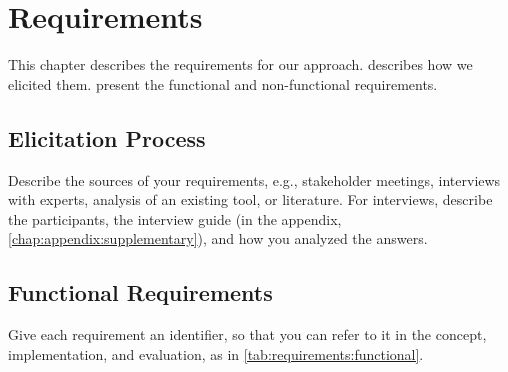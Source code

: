 \chapter{Requirements}\label{chap:requirements}


This chapter describes the requirements for our approach.
 describes how we elicited them.
 present the functional and non-functional requirements.

\section{Elicitation Process}\label{sec:requirements:elicitation}

Describe the sources of your requirements, e.g., stakeholder meetings, interviews with experts, analysis of an existing tool, or literature.
For interviews, describe the participants, the interview guide (in the appendix, \cref{chap:appendix:supplementary}), and how you analyzed the answers.

\section{Functional Requirements}\label{sec:requirements:functional}

Give each requirement an identifier, so that you can refer to it in the concept, implementation, and evaluation, as in \cref{tab:requirements:functional}.

